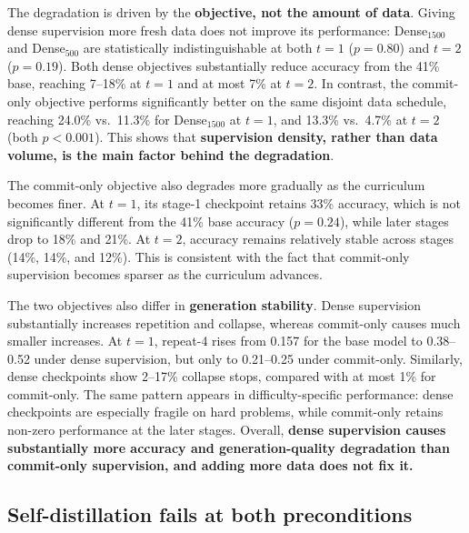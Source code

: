 \documentclass{article}
\begin{document}
The degradation is driven by the \textbf{objective, not the amount of data}. Giving dense supervision more fresh data does not improve its performance: Dense$_{1500}$ and Dense$_{500}$ are statistically indistinguishable at both $t=1$ ($p=0.80$) and $t=2$ ($p=0.19$). Both dense objectives substantially reduce accuracy from the 41\% base, reaching 7--18\% at $t=1$ and at most 7\% at $t=2$. In contrast, the commit-only objective performs significantly better on the same disjoint data schedule, reaching 24.0\% vs.\ 11.3\% for Dense$_{1500}$ at $t=1$, and 13.3\% vs.\ 4.7\% at $t=2$ (both $p<0.001$). This shows that \textbf{supervision density, rather than data volume, is the main factor behind the degradation}.

The commit-only objective also degrades more gradually as the curriculum becomes finer. At $t=1$, its stage-1 checkpoint retains 33\% accuracy, which is not significantly different from the 41\% base accuracy ($p=0.24$), while later stages drop to 18\% and 21\%. At $t=2$, accuracy remains relatively stable across stages (14\%, 14\%, and 12\%). This is consistent with the fact that commit-only supervision becomes sparser as the curriculum advances.

The two objectives also differ in \textbf{generation stability}. Dense supervision substantially increases repetition and collapse, whereas commit-only causes much smaller increases. At $t=1$, repeat-4 rises from 0.157 for the base model to 0.38--0.52 under dense supervision, but only to 0.21--0.25 under commit-only. Similarly, dense checkpoints show 2--17\% collapse stops, compared with at most 1\% for commit-only. The same pattern appears in difficulty-specific performance: dense checkpoints are especially fragile on hard problems, while commit-only retains non-zero performance at the later stages. Overall, \textbf{dense supervision causes substantially more accuracy and generation-quality degradation than commit-only supervision, and adding more data does not fix it.}

\subsection{Self-distillation fails at both preconditions}
\label{sec:opsd}
\end{document}
